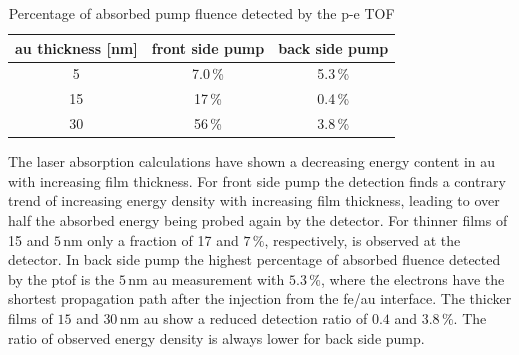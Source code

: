 \documentclass[a4paper,12pt,twoside]{article}
\begin{document}
 	    \begin{table}[H]
	    \centering
		    \caption{Percentage of absorbed pump fluence detected by the p-e TOF}
		    \begin{tabular}{ccc}
			    \gls{au} thickness [nm] & front side pump & back side pump \\
		    	\hline
		    	5 & 7.0\,\% & 5.3\,\% \\
		    	15 & 17\,\% & 0.4\,\% \\
		    	30 & 56\,\% & 3.8\,\% \\
		    \end{tabular}
		        \label{injectable}
        \end{table}
The laser absorption calculations have shown a decreasing energy content in \gls{au} with increasing film thickness. For front side pump the detection finds a contrary trend of increasing energy density with increasing film thickness, leading to over half the absorbed energy being probed again by the detector. For thinner films of 15 and $5\,\mathrm{nm}$ only a fraction of 17 and $7\,\%$, respectively, is observed at the detector. In back side pump the highest percentage of absorbed fluence detected by the \gls{ptof} is the $5\,\mathrm{nm}$ \gls{au} measurement with $5.3\,\%$, where the electrons have the shortest propagation path after the injection from the \gls{fe}/\gls{au} interface. The thicker films of $15$ and $30\,\mathrm{nm}$ \gls{au} show a reduced detection ratio of $0.4$ and $3.8\,\%$. The ratio of observed energy density is always lower for back side pump.
\end{document}
